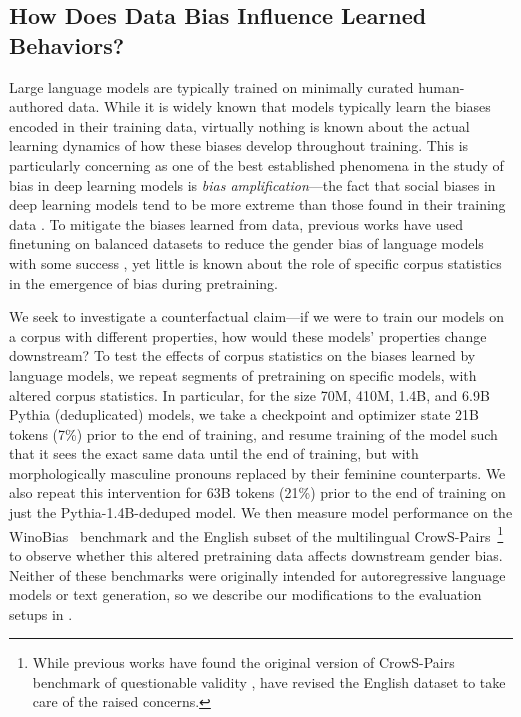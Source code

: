 \documentclass{article}
\theoremstyle{plain}
\theoremstyle{definition}
\theoremstyle{remark}
\begin{document}
\subsection{How Does Data Bias Influence Learned Behaviors?} \label{bias_section}
Large language models are typically trained on minimally curated human-authored data. While it is widely known that models typically learn the  biases encoded in their training data, virtually nothing is known about the actual learning dynamics of how these biases develop throughout training. This is particularly concerning as one of the best established phenomena in the study of bias in deep learning models is \textit{bias amplification}---the fact that social biases in deep learning models tend to be more extreme than those found in their training data \citep{zhao2017men,hirota2022quantifying,hall2022systematic}. 
To mitigate the biases learned from data, previous works have used finetuning on balanced datasets to reduce the gender bias of language models with some success \citep{levy2021collecting,gira2022debiasing,kirtane2022efficient}, yet little is known about the role of specific corpus statistics in the emergence of bias during pretraining.

We seek to investigate a counterfactual claim---if we were to train our models on a corpus with different properties, how would these models' properties change downstream? To test the effects of corpus statistics on the biases learned by language models, we repeat segments of pretraining on specific models, with altered corpus statistics. In particular, for the size 70M, 410M, 1.4B, and 6.9B Pythia (deduplicated) models, we take a checkpoint and optimizer state 21B tokens (7\%) prior to the end of training, and resume training of the model such that it sees the exact same data until the end of training, but with morphologically masculine pronouns replaced by their feminine counterparts. We also repeat this intervention for 63B tokens (21\%) prior to the end of training on just the Pythia-1.4B-deduped model. We then measure model performance on the WinoBias~\citep{zhao2018gender} benchmark and the English subset of the multilingual CrowS-Pairs~\citep{neveol-etal-2022-french}\footnote{While previous works have found the original version of CrowS-Pairs~\citep{nangia-etal-2020-crows} benchmark of questionable validity \citep{blodgett-etal-2021-stereotyping}, \citet{neveol-etal-2022-french} have revised the English dataset to take care of the raised concerns.} to observe whether this altered pretraining data affects downstream gender bias.
Neither of these benchmarks were originally intended for autoregressive language models or text generation, so we describe our modifications to the evaluation setups in .
\end{document}
